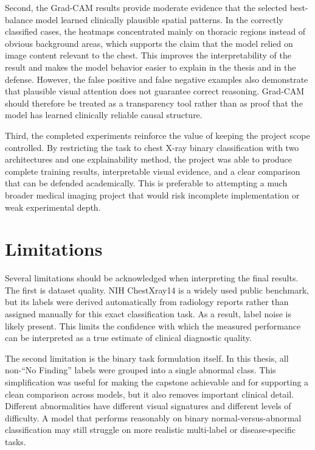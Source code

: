 Second, the Grad-CAM results provide moderate evidence that the selected best-balance model learned clinically plausible spatial patterns. In the correctly classified cases, the heatmaps concentrated mainly on thoracic regions instead of obvious background areas, which supports the claim that the model relied on image content relevant to the chest. This improves the interpretability of the result and makes the model behavior easier to explain in the thesis and in the defense. However, the false positive and false negative examples also demonstrate that plausible visual attention does not guarantee correct reasoning. Grad-CAM should therefore be treated as a transparency tool rather than as proof that the model has learned clinically reliable causal structure.

Third, the completed experiments reinforce the value of keeping the project scope controlled. By restricting the task to chest X-ray binary classification with two architectures and one explainability method, the project was able to produce complete training results, interpretable visual evidence, and a clear comparison that can be defended academically. This is preferable to attempting a much broader medical imaging project that would risk incomplete implementation or weak experimental depth.

\section{Limitations}
Several limitations should be acknowledged when interpreting the final results. The first is dataset quality. NIH ChestXray14 is a widely used public benchmark, but its labels were derived automatically from radiology reports rather than assigned manually for this exact classification task. As a result, label noise is likely present. This limits the confidence with which the measured performance can be interpreted as a true estimate of clinical diagnostic quality.

The second limitation is the binary task formulation itself. In this thesis, all non-``No Finding'' labels were grouped into a single abnormal class. This simplification was useful for making the capstone achievable and for supporting a clean comparison across models, but it also removes important clinical detail. Different abnormalities have different visual signatures and different levels of difficulty. A model that performs reasonably on binary normal-versus-abnormal classification may still struggle on more realistic multi-label or disease-specific tasks.

